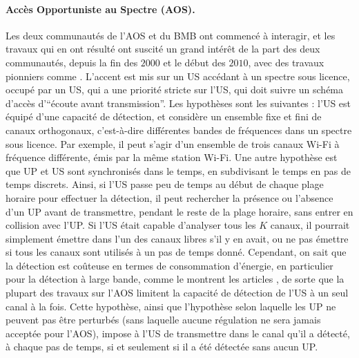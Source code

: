 \begin{resume_fr}
\paragraph{Accès Opportuniste au Spectre (AOS).}
%
Les deux communautés de l'AOS et du BMB ont commencé à interagir, et les travaux qui en ont résulté ont suscité un grand intérêt de la part des deux communautés, depuis la fin des $2000$ et le début des $2010$, avec des travaux pionniers comme \cite{Liu08,Zhao10,Jouini09,Jouini10}.
L'accent est mis sur un US accédant à un spectre sous licence, occupé par un US, qui a une priorité stricte sur l'US, qui doit suivre un schéma d'accès d'``écoute avant transmission''.
%
Les hypothèses sont les suivantes :
l'US est équipé d'une capacité de détection,
et considère un ensemble fixe et fini de canaux orthogonaux, c'est-à-dire différentes bandes de fréquences dans un spectre sous licence.
Par exemple, il peut s'agir d'un ensemble de trois canaux Wi-Fi à fréquence différente, émis par la même station Wi-Fi.
Une autre hypothèse est que UP et US sont synchronisés dans le temps, en subdivisant le temps en pas de temps discrets.
%
Ainsi, si l'US passe peu de temps au début de chaque plage horaire pour effectuer la détection, il peut rechercher la présence ou l'absence d'un UP avant de transmettre, pendant le reste de la plage horaire, sans entrer en collision avec l'UP.
Si l'US était capable d'analyser tous les $K$ canaux, il pourrait simplement émettre dans l'un des canaux libres s'il y en avait, ou ne pas émettre si tous les canaux sont utilisés à un pas de temps donné.
%
Cependant, on sait que la détection est coûteuse en termes de consommation d'énergie, en particulier pour la détection à large bande, comme le montrent les articles \cite{yucek2009survey,subhedar2011spectrum}, de sorte que la plupart des travaux sur l'AOS limitent la capacité de détection de l'US à un seul canal à la fois.
Cette hypothèse, ainsi que l'hypothèse selon laquelle les UP ne peuvent pas être perturbés (sans laquelle aucune régulation ne sera jamais acceptée pour l'AOS), impose à l'US de transmettre dans le canal qu'il a détecté, à chaque pas de temps, si et seulement si il a été détectée sans aucun UP.


\end{resume_fr}
